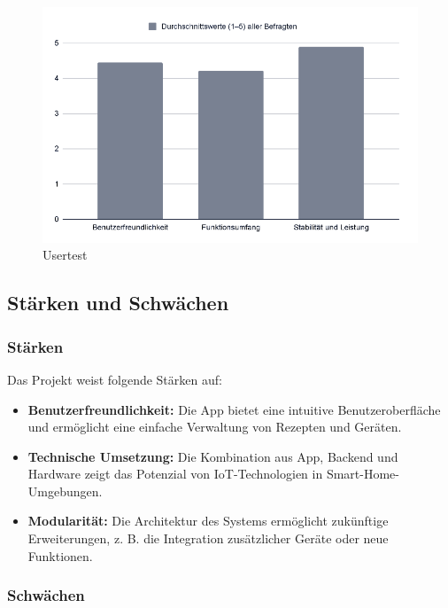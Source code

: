 \begin{figure}[h!]
    \centering
    \begin{minipage}{0.80\textwidth}
        \centering
        \includegraphics[width=\textwidth]{graphics/images/usertests_app.png}
        \caption{Usertest}
        \label{fig:user_tests2} %
    \end{minipage}
\end{figure}


\subsection{Stärken und Schwächen}

\subsubsection{Stärken}

Das Projekt weist folgende Stärken auf:
\begin{itemize}
  \item \textbf{Benutzerfreundlichkeit:} Die App bietet eine intuitive Benutzeroberfläche und 
  ermöglicht eine einfache Verwaltung von Rezepten und Geräten.
  \item \textbf{Technische Umsetzung:} Die Kombination aus App, Backend und Hardware zeigt das 
  Potenzial von IoT-Technologien in Smart-Home-Umgebungen.
  \item \textbf{Modularität:} Die Architektur des Systems ermöglicht zukünftige Erweiterungen, z. B. 
  die Integration zusätzlicher Geräte oder neue Funktionen.
\end{itemize}

\subsubsection*{Schwächen}

